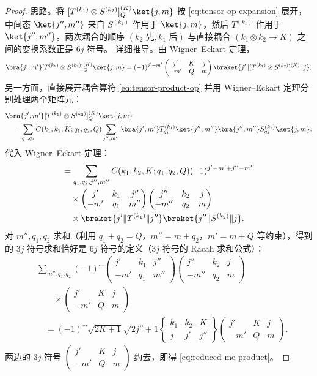 \begin{proof}
思路。将 $[T^{(k_1)}\otimes S^{(k_2)}]^{(K)}_Q\ket{j,m}$ 按 \cref{eq:tensor-op-expansion} 展开，中间态 $\ket{j'',m''}$ 来自 $S^{(k_2)}$ 作用于 $\ket{j,m}$，然后 $T^{(k_1)}$ 作用于 $\ket{j'',m''}$。两次耦合的顺序 $(k_2\text{ 先}, k_1\text{ 后})$ 与直接耦合 $(k_1\otimes k_2\to K)$ 之间的变换系数正是 $6j$ 符号。
详细推导。由 Wigner--Eckart 定理，
\[
\bra{j',m'}[T^{(k_1)}\otimes S^{(k_2)}]^{(K)}_Q\ket{j,m}
=(-1)^{j'-m'}\begin{pmatrix}j'&K&j\\-m'&Q&m\end{pmatrix}\braket{j'\|[T^{(k_1)}\otimes S^{(k_2)}]^{(K)}\|j}.
\]
另一方面，直接展开耦合算符 \cref{eq:tensor-product-op} 并用 Wigner--Eckart 定理分别处理两个矩阵元：
\begin{align*}
&\bra{j',m'}[T^{(k_1)}\otimes S^{(k_2)}]^{(K)}_Q\ket{j,m}\\
&\quad=\sum_{q_1,q_2}C(k_1,k_2,K;q_1,q_2,Q)
\sum_{j'',m''}
\bra{j',m'}T^{(k_1)}_{q_1}\ket{j'',m''}
\bra{j'',m''}S^{(k_2)}_{q_2}\ket{j,m}.
\end{align*}
代入 Wigner--Eckart 定理：
\begin{align*}
&=\sum_{q_1,q_2,j'',m''}
C(k_1,k_2,K;q_1,q_2,Q)(-1)^{j'-m'+j''-m''}\\
&\quad\times
\begin{pmatrix}j'&k_1&j''\\-m'&q_1&m''\end{pmatrix}
\begin{pmatrix}j''&k_2&j\\-m''&q_2&m\end{pmatrix}\\
&\quad\times
\braket{j'\|T^{(k_1)}\|j''}
\braket{j''\|S^{(k_2)}\|j}.
\end{align*}
对 $m'',q_1,q_2$ 求和（利用 $q_1+q_2=Q$，$m''=m+q_2$，$m'=m+Q$ 等约束），得到的 $3j$ 符号求和恰好是 $6j$ 符号的定义（$3j$ 符号的 Racah 求和公式）：
\begin{align*}
&\sum_{m'',q_1,q_2}(-1)^{\cdots}
\begin{pmatrix}j'&k_1&j''\\-m'&q_1&m''\end{pmatrix}
\begin{pmatrix}j''&k_2&j\\-m''&q_2&m\end{pmatrix}\\
&\qquad\times
\begin{pmatrix}j'&K&j\\-m'&Q&m\end{pmatrix}\\
&\quad=(-1)^{\cdots}\sqrt{2K+1}\sqrt{2j''+1}
\begin{Bmatrix}k_1&k_2&K\\j&j'&j''\end{Bmatrix}
\begin{pmatrix}j'&K&j\\-m'&Q&m\end{pmatrix}.
\end{align*}
两边的 $3j$ 符号 $\begin{pmatrix}j'&K&j\\-m'&Q&m\end{pmatrix}$ 约去，即得 \cref{eq:reduced-me-product}。
\end{proof}
